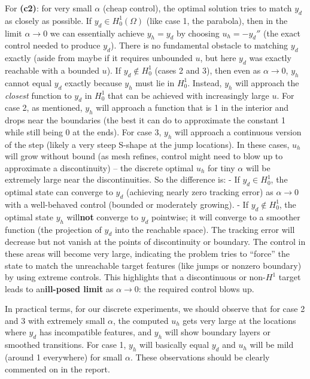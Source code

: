 \documentclass[a4paper,10pt]{report}
\begin{document}
For \textbf{(c2)}: for very small \(\alpha\) (cheap control), the optimal solution tries to match \(y_d\) as closely as possible. If \(y_d \in H^1_0(\Omega)\) (like case 1, the parabola), then in the limit \(\alpha \to 0\) we can essentially achieve \(y_h = y_d\) by choosing \(u_h = -y_d''\) (the exact control needed to produce \(y_d\)). There is no fundamental obstacle to matching \(y_d\) exactly (aside from maybe if it requires unbounded \(u\), but here \(y_d\) was exactly reachable with a bounded \(u\)). If \(y_d \notin H^1_0\) (cases 2 and 3), then even as \(\alpha \to 0\), \(y_h\) cannot equal \(y_d\) exactly because \(y_h\) must lie in \(H^1_0\). Instead, \(y_h\) will approach the \emph{closest} function to \(y_d\) in \(H^1_0\) that can be achieved with increasingly large \(u\). For case 2, as mentioned, \(y_h\) will approach a function that is 1 in the interior and drops near the boundaries (the best it can do to approximate the constant 1 while still being 0 at the ends). For case 3, \(y_h\) will approach a continuous version of the step (likely a very steep S-shape at the jump locations). In these cases, \(u_h\) will grow without bound (as mesh refines, control might need to blow up to approximate a discontinuity) – the discrete optimal \(u_h\) for tiny \(\alpha\) will be extremely large near the discontinuities. So the difference is:
- If \(y_d \in H^1_0\), the optimal state can converge to \(y_d\) (achieving nearly zero tracking error) as \(\alpha \to 0\) with a well-behaved control (bounded or moderately growing).
- If \(y_d \notin H^1_0\), the optimal state \(y_h\) will\textbf{not} converge to \(y_d\) pointwise; it will converge to a smoother function (the projection of \(y_d\) into the reachable space). The tracking error will decrease but not vanish at the points of discontinuity or boundary. The control in these areas will become very large, indicating the problem tries to “force” the state to match the unreachable target features (like jumps or nonzero boundary) by using extreme controls. This highlights that a discontinuous or non-\(H^1\) target leads to an\textbf{ill-posed limit} as \(\alpha \to 0\): the required control blows up.

In practical terms, for our discrete experiments, we should observe that for case 2 and 3 with extremely small \(\alpha\), the computed \(u_h\) gets very large at the locations where \(y_d\) has incompatible features, and \(y_h\) will show boundary layers or smoothed transitions. For case 1, \(y_h\) will basically equal \(y_d\) and \(u_h\) will be mild (around 1 everywhere) for small \(\alpha\). These observations should be clearly commented on in the report.
\end{document}
